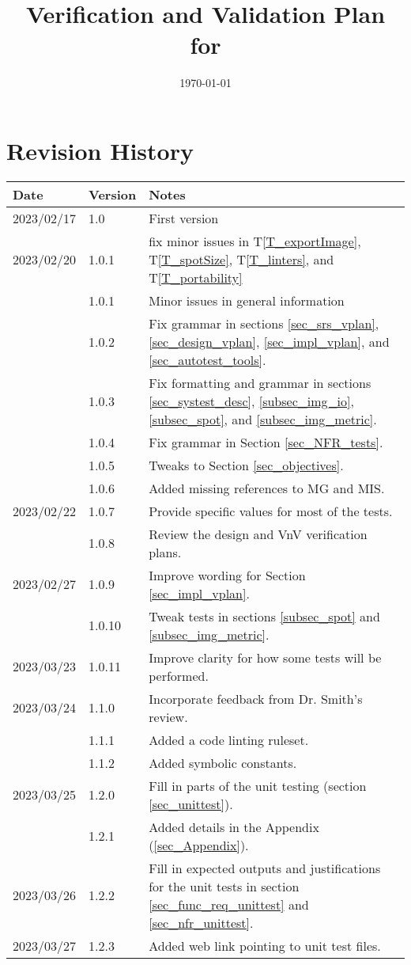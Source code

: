 \documentclass[12pt, titlepage]{article}
\begin{document}
\title{Verification and Validation Plan for \progname{}} 
\author{\authname}
\date{\today}
	
\maketitle


\section{Revision History}

\begin{tabularx}{\textwidth}{p{2.2cm}p{1.8cm}X}
\toprule {\bf Date} & {\bf Version} & {\bf Notes}\\
\midrule
2023/02/17 & 1.0 & First version \\
2023/02/20 & 1.0.1 & fix minor issues in T\ref{T_exportImage}, T\ref{T_spotSize}, T\ref{T_linters}, 
  and T\ref{T_portability}\\
  & 1.0.1 & Minor issues in general information\\
  & 1.0.2 & Fix grammar in sections \ref{sec_srs_vplan}, 
  \ref{sec_design_vplan}, \ref{sec_impl_vplan}, and \ref{sec_autotest_tools}. \\
  & 1.0.3 & Fix formatting and grammar in sections \ref{sec_systest_desc}, 
  \ref{subsec_img_io}, \ref{subsec_spot}, and \ref{subsec_img_metric}. \\
  & 1.0.4 & Fix grammar in Section \ref{sec_NFR_tests}. \\
  & 1.0.5 & Tweaks to Section \ref{sec_objectives}. \\
  & 1.0.6 & Added missing references to MG and MIS. \\
2023/02/22 & 1.0.7 & Provide specific values for most of the tests. \\
  & 1.0.8 & Review the design and VnV verification plans. \\
2023/02/27 & 1.0.9 & Improve wording for Section \ref{sec_impl_vplan}. \\
  & 1.0.10 & Tweak tests in sections \ref{subsec_spot} and \ref{subsec_img_metric}. \\
2023/03/23 & 1.0.11 & Improve clarity for how some tests will be performed.\\
2023/03/24 & 1.1.0 & Incorporate feedback from Dr. Smith's review.\\
  & 1.1.1 & Added a code linting ruleset.\\
  & 1.1.2 & Added symbolic constants.\\
2023/03/25 & 1.2.0 & Fill in parts of the unit testing (section \ref{sec_unittest}). \\
  & 1.2.1 & Added details in the Appendix (\ref{sec_Appendix}). \\
2023/03/26 & 1.2.2 & Fill in expected outputs and justifications for
  the unit tests in section \ref{sec_func_req_unittest} and \ref{sec_nfr_unittest}. \\
2023/03/27 & 1.2.3 & Added web link pointing to unit test files. \\
\bottomrule
\end{tabularx}
\end{document}
